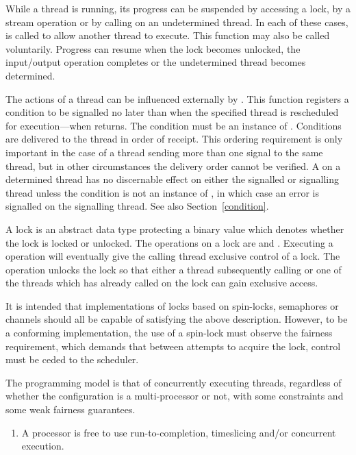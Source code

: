 \begin{optDefinition}
While a thread is running, its progress can be suspended by accessing a lock, by
a stream operation or by calling  on an undetermined
thread.  In each of these cases,  is called to
allow another thread to execute.  This function may also be called voluntarily.
Progress can resume when the lock becomes unlocked, the input/output operation
completes or the undetermined thread becomes determined.

The actions of a thread can be influenced externally by .
This function registers a condition to be signalled no later than when the
specified thread is rescheduled for execution---when
 returns.  The condition must be an instance of
.  Conditions are delivered to the thread in
order of receipt.  This ordering requirement is only important in the case of a
thread sending more than one signal to the same thread, but in other
circumstances the delivery order cannot be verified.  A  on
a determined thread has no discernable effect on either the signalled or
signalling thread unless the condition is not an instance of
, in which case an error is signalled on the
signalling thread.  See also Section~\ref{condition}.

A lock is an abstract data type protecting a binary value which denotes whether
the lock is locked or unlocked.  The operations on a lock are 
and .  Executing a  operation will
eventually give the calling thread exclusive control of a lock.  The
 operation unlocks the lock so that either a thread
subsequently calling  or one of the threads which has already
called  on the lock can gain exclusive access.
%
\begin{note}
    It is intended that implementations of locks based on spin-locks, semaphores
    or channels should all be capable of satisfying the above description.
    However, to be a conforming implementation, the use of a spin-lock must
    observe the fairness requirement, which demands that between attempts to
    acquire the lock, control must be ceded to the scheduler.
\end{note}
%
The programming model is that of concurrently executing threads,
regardless of whether the configuration is a multi-processor or not,
with some constraints and some weak fairness guarantees.
%
\begin{enumerate}
    \item A processor is free to use run-to-completion, timeslicing and/or
    concurrent execution.


\end{enumerate}
\end{optDefinition}
